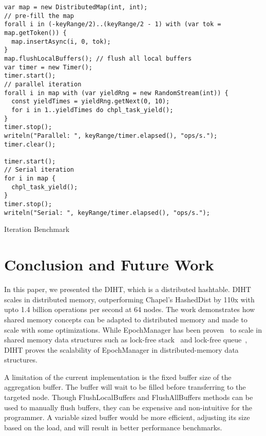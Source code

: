 \documentclass[letterpaper, 10 pt, conference]{ieeeconf}  %
\begin{document}
\begin{listing}
\begin{verbatim}
var map = new DistributedMap(int, int);
// pre-fill the map
forall i in (-keyRange/2)..(keyRange/2 - 1) with (var tok = map.getToken()) {
  map.insertAsync(i, 0, tok);
}
map.flushLocalBuffers(); // flush all local buffers
var timer = new Timer();
timer.start();
// parallel iteration
forall i in map with (var yieldRng = new RandomStream(int)) {
  const yieldTimes = yieldRng.getNext(0, 10);
  for i in 1..yieldTimes do chpl_task_yield();
}
timer.stop();
writeln("Parallel: ", keyRange/timer.elapsed(), "ops/s.");
timer.clear();

timer.start();
// Serial iteration
for i in map {
  chpl_task_yield();
}
timer.stop();
writeln("Serial: ", keyRange/timer.elapsed(), "ops/s.");
\end{verbatim}
\label{lst:microIt}
\caption{Iteration Benchmark}
\end{listing}




\section{Conclusion and Future Work}


In this paper, we presented the DIHT, which is a distributed hashtable. DIHT scales in distributed memory, outperforming Chapel's HashedDist by 110x with upto 1.4 billion operations per second at 64 nodes. The work demonstrates how shared memory concepts can be adapted to distributed memory and made to scale with some optimizations. While EpochManager has been proven~\cite{epochManager} to scale in shared memory data structures such as lock-free stack~\cite{hendlerScalableLockfreeStack2004} and lock-free queue~\cite{michaelSimpleFastPractical1996}, DIHT proves the scalability of EpochManager in distributed-memory data structures.

A limitation of the current implementation is the fixed buffer size of the aggregation buffer. The buffer will wait to be filled before transferring to the targeted node. Though FlushLocalBuffers and FlushAllBuffers methods can be used to manually flush buffers, they can be expensive and non-intuitive for the programmer. A variable sized buffer would be more efficient, adjusting its size based on the load, and will result in better performance benchmarks.
\end{document}
